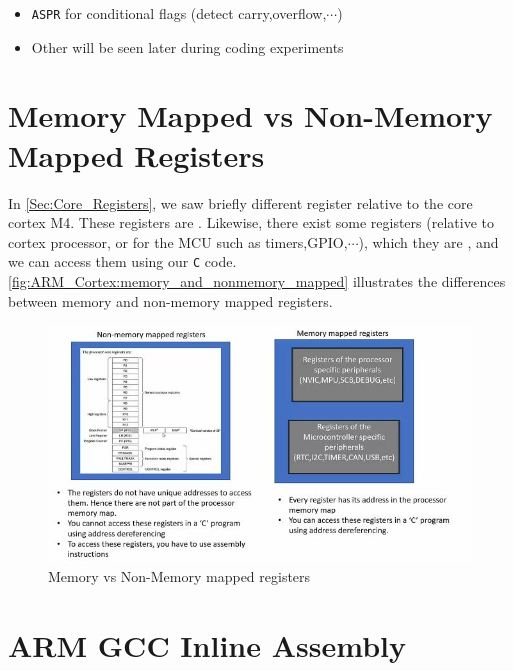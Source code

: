 \begin{itemize}
    \begin{itemize}
        \item \verb|ASPR| for conditional flags (detect carry,overflow,$\cdots$)

        \item Other will be seen later during coding experiments
    \end{itemize}
    
\end{itemize}

\newpage
\section{Memory Mapped vs Non-Memory Mapped Registers}

In \autoref{Sec:Core_Registers}, we saw briefly different register relative to the core cortex M4. These registers are . Likewise, there exist some registers (relative to cortex processor, or for the MCU such as timers,GPIO,$\cdots$), which they are , and we can access them using our \verb|C| code. \autoref{fig:ARM_Cortex:memory_and_nonmemory_mapped}  illustrates the differences between memory and non-memory mapped registers.

\begin{figure}[h]
\centering
\includegraphics[scale=1.1]{Figures/ARM_Cortex/memory_and_nonmemory_mapped}
\caption{Memory vs Non-Memory mapped registers}
\label{fig:ARM_Cortex:memory_and_nonmemory_mapped}
\end{figure}


\newpage

\section{ARM GCC Inline Assembly}
\label{Sec:inline_assembly}

